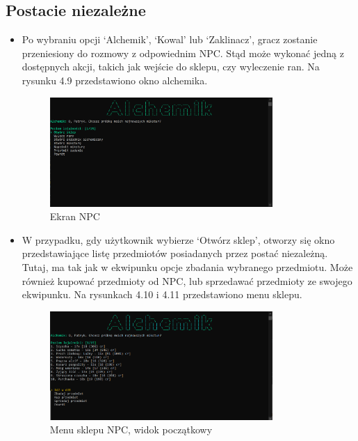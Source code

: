\subsection{Postacie niezależne}
\begin{itemize}
    \item Po wybraniu opcji `Alchemik', `Kowal' lub `Zaklinacz', gracz zostanie przeniesiony do rozmowy z odpowiednim NPC. Stąd może
    wykonać jedną z dostępnych akcji, takich jak wejście do sklepu, czy wyleczenie ran. Na rysunku 4.9 przedstawiono okno alchemika.
        \begin{figure}[H]
            \centering
            \includegraphics[width=0.8\textwidth]{figures/warstwa_uzytkowa/npc_1.png}
            \caption{Ekran NPC}
            \label{fig:npc_1}
        \end{figure}
    \item W przypadku, gdy użytkownik wybierze `Otwórz sklep', otworzy się okno przedstawiające listę przedmiotów posiadanych przez postać niezależną.
    Tutaj, ma tak jak w ekwipunku opcje zbadania wybranego przedmiotu. Może również kupować przedmioty od NPC, 
    lub sprzedawać przedmioty ze swojego ekwipunku. Na rysunkach 4.10 i 4.11 przedstawiono menu sklepu.
        \begin{figure}[H]
            \centering
            \includegraphics[width=0.8\textwidth]{figures/warstwa_uzytkowa/npc_2.png}
            \caption{Menu sklepu NPC, widok początkowy}
            \label{fig:npc_2}
        \end{figure}

\end{itemize}
